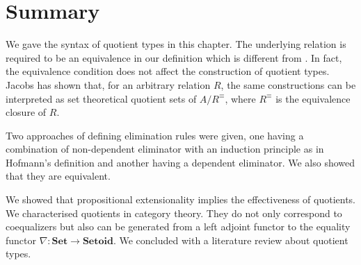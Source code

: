 \section{Summary}

We gave the syntax of quotient types in this chapter. The underlying
relation is required to be an equivalence in our definition which is
different from \cite{hof:95:sm}. In fact, the equivalence condition
does not affect the construction of quotient types. Jacobs
\cite{Jacobs94quotientsin} has shown that, for an arbitrary relation
$R$, the same constructions can be interpreted as set theoretical
quotient sets of $A/R^{\equiv}$, where $R^{\equiv}$ is the equivalence
closure of $R$.

Two approaches of defining elimination rules were given, one having a
combination of non-dependent eliminator with an induction principle as
in Hofmann's definition and another having a dependent eliminator. We
also showed that they are equivalent.

We showed that propositional extensionality implies the effectiveness
of quotients. We characterised quotients in category theory. They do
not only correspond to coequalizers but also can be generated from a
left adjoint functor to the equality functor $\nabla : \textbf{Set}
\to \textbf{Setoid}$. We concluded with a literature review about
quotient types.






